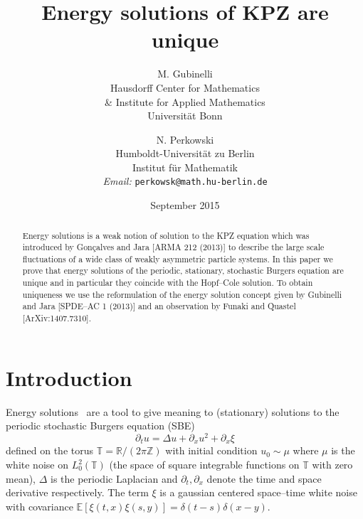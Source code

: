 \documentclass[a4paper,11pt]{article}
\newcommand{\tmaffiliation}[1]{\\ #1}
\newcommand{\tmemail}[1]{\\ \textit{Email:} \texttt{#1}}
\begin{document}
\title{Energy solutions of KPZ are unique}

\author{
  M. Gubinelli
  \tmaffiliation{
  Hausdorff Center for Mathematics\\
   \& Institute for Applied Mathematics\\
   Universit{\"a}t Bonn}
  \and
  N. Perkowski
  \tmaffiliation{Humboldt-Universit{\"a}t zu Berlin\\
  Institut f{\"u}r Mathematik }
  \tmemail{perkowsk@math.hu-berlin.de}
}

\date{September 2015}

\maketitle

\begin{abstract}
Energy solutions is a weak notion of solution to the KPZ equation which was
introduced by Gon{\c c}alves and Jara [ARMA 212 (2013)] to describe the large
scale fluctuations of a wide class of weakly asymmetric particle systems. In
this paper we prove that energy solutions of the periodic, stationary,
stochastic Burgers equation are unique and in particular they coincide with
the Hopf--Cole solution. To obtain uniqueness we use the reformulation of the
energy solution concept given by Gubinelli and Jara [SPDE--AC 1 (2013)] and
an observation by Funaki and Quastel [ArXiv:1407.7310]. 
\end{abstract}

\section{Introduction}

Energy
solutions~{\cite{goncalves_nonlinear_2013,gubinelli_regularization_2013,gubinelli_lectures_2015}}
are a tool to give meaning to (stationary) solutions to the periodic
stochastic Burgers equation (SBE)
\begin{equation}
  \partial_t u = \Delta u + \partial_x u^2 + \partial_x \xi \label{eq:sbe}
\end{equation}
defined on the torus $\mathbb{T}=\mathbb{R}/ (2 \pi \mathbb{Z})$ with
initial condition $u_0 \sim \mu$ where $\mu$ is the white noise on $L^2_0
(\mathbb{T})$ (the space of square integrable functions on $\mathbb{T}$ with
zero mean), $\Delta$ is the periodic Laplacian and $\partial_t, \partial_x$
denote the time and space derivative respectively. The term $\xi$ is a
gaussian centered space--time white noise with covariance $\mathbb{E} [\xi
(t, x) \xi (s, y)] = \delta (t - s) \delta (x - y)$.
\end{document}
